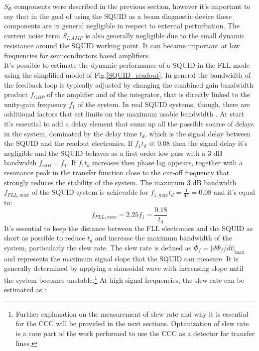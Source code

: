 \documentclass[12pt,a4paper]{report}
\begin{document}
    $S_{\Phi}$ components were described in the previous section, however it's important to say that in the goal of using the SQUID as a beam diagnostic device these components are in general negligible in respect to external perturbation.
    The current noise term $S_{I,AMP}$ is also generally negligible due to the small dynamic resistance around the SQUID working point. It can became important at low frequencies for semiconductors based amplifiers. \\
    It's possible to estimate the dynamic performance of a SQUID in the FLL mode using the simplified model of Fig.\ref{SQUID_readout}. In general the bandwidth of the feedback loop is typically adjusted by changing the combined gain bandwidth product $f_{GBP}$ of the amplifier and of the integrator, that is directly linked to the unity-gain frequency $f_1$ of the system. In real SQUID systems, though, there are additional factors that set limits on the maximum usable bandwidth \cite{SQUID_book_2}.
    At start it's essential to add a delay element that sums up all the possible source of delays in the system, dominated by the delay time $t_d$, which is the signal delay between the SQUID and the readout electronics. If $f_1t_d \ll 0.08$ then the signal delay it's negligible and the SQUID behaves as a first order low pass with a 3 dB bandwidth $f_{3dB} = f_1$. If $f_1t_d$ increases then phase lag appears, together with a resonance peak in the transfer function close to the cut-off frequency that strongly reduces the stability of the system. The maximum 3 dB bandwidth $f_{FLL,max}$ of the SQUID system is achievable for $f_{1,max}t_d = \frac{1}{4\pi} = 0.08$ \cite{Squid_handbook_1} and it's equal to:
    \begin{equation}
    	f_{FLL,max} = 2.25 f_1 = \frac{0.18}{t_d}
    	\label{CH2_maxf}
    \end{equation}
    It's essential to keep the distance between the FLL electronics and the SQUID as short as possible to reduce \(t_d\) and increase the maximum bandwidth of the system, particularly the slew rate. The slew rate is defined as \(\dot{\Phi_f} = \left| d\Phi_f/dt \right|_{\text{max}}\) and represents the maximum signal slope that the SQUID can measure. It is generally determined by applying a sinusoidal wave with increasing slope until the system becomes unstable.\footnote{Further explanation on the measurement of slew rate and why it is essential for the CCC will be provided in the next sections. Optimization of slew rate is a core part of the work performed to use the CCC as a detector for transfer lines.} At high signal frequencies, the slew rate can be estimated as \cite{Squid_handbook_1}:
\end{document}
